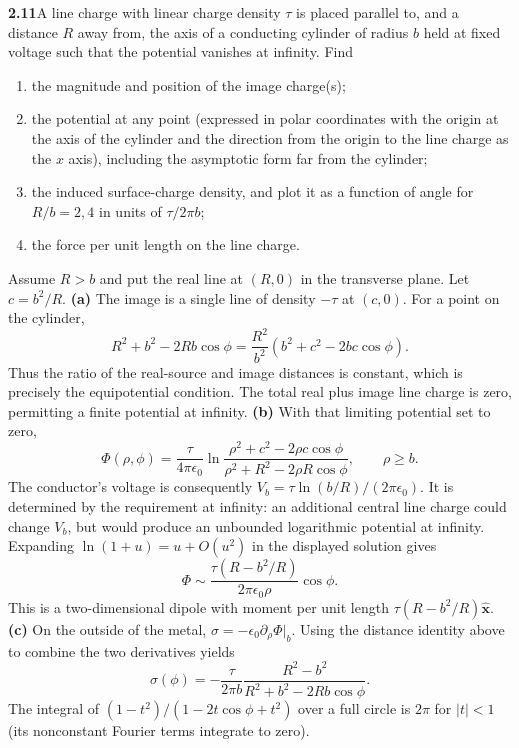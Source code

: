 \par\bigskip
\noindent\textbf{2.11}\quad A line charge with linear charge density $\tau$ is placed parallel to, and a distance $R$ away from, the axis of a conducting cylinder of radius $b$ held at fixed voltage such that the potential vanishes at infinity. Find
\begin{enumerate}
\item[(a)] the magnitude and position of the image charge(s);
\item[(b)] the potential at any point (expressed in polar coordinates with the origin at the axis of the cylinder and the direction from the origin to the line charge as the $x$ axis), including the asymptotic form far from the cylinder;
\item[(c)] the induced surface-charge density, and plot it as a function of angle for $R/b=2,4$ in units of $\tau/2\pi b$;
\item[(d)] the force per unit length on the line charge.
\end{enumerate}
\solution
Assume $R>b$ and put the real line at $(R,0)$ in the transverse
plane. Let $c=b^2/R$.
\textbf{(a)} The image is a single line of density $-\tau$ at
$(c,0)$. For a point on the cylinder,
\[
R^2+b^2-2Rb\cos\phi
=\frac{R^2}{b^2}(b^2+c^2-2bc\cos\phi).
\]
Thus the ratio of the real-source and image distances is constant,
which is precisely the equipotential condition. The total real plus
image line charge is zero, permitting a finite potential at infinity.
\textbf{(b)} With that limiting potential set to zero,
\[
\boxed{\Phi(\rho,\phi)=\frac{\tau}{4\pi\epsilon _0}
 \ln\frac{\rho^2+c^2-2\rho c\cos\phi}
          {\rho^2+R^2-2\rho R\cos\phi},\qquad\rho\geq b.}
\]
The conductor's voltage is consequently
$V_b=\tau\ln(b/R)/(2\pi\epsilon _0)$. It is determined by the
requirement at infinity: an additional central line charge could
change $V_b$, but would produce an unbounded logarithmic potential
at infinity. Expanding $\ln(1+u)=u+O(u^2)$ in the displayed solution gives
\[
\boxed{\Phi\sim\frac{\tau(R-b^2/R)}{2\pi\epsilon _0\rho}\cos\phi.}
\]
This is a two-dimensional dipole with moment per unit length
$\tau(R-b^2/R)\widehat{\mathbf x}$.
\textbf{(c)} On the outside of the metal,
$\sigma=-\epsilon _0\partial_\rho\Phi|_b$. Using the distance
identity above to combine the two derivatives yields
\[
\boxed{\sigma(\phi)=-\frac{\tau}{2\pi b}
 \frac{R^2-b^2}{R^2+b^2-2Rb\cos\phi}.}
\]
The integral of $(1-t^2)/(1-2t\cos\phi+t^2)$ over a full circle is
$2\pi$ for $|t|<1$ (its nonconstant Fourier terms integrate to zero).
